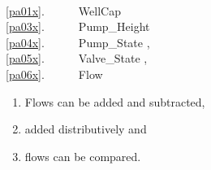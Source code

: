 \bp
\>\ \\
\ref{pa01x}.\ \ \ \ \ \ WellCap \\
\ref{pa03x}.\ \ \ \ \ \ Pump\_Height \\
\ref{pa04x}.\ \ \ \ \ \ Pump\_State {\EQ}{\EQ} {\LBRACE}{\BAR}, \\
\ref{pa05x}.\ \ \ \ \ \ Valve\_State {\EQ}{\EQ} {\LBRACE}{\BAR}, \\
\ref{pa06x}.\ \ \ \ \ \ Flow 
\ep
\begin{enumerate}\setei
\item \label{pa05y1} Flows can be added and subtracted,
\item \label{pa05y2} added distributively  and
\item \label{pa05z} flows can be compared.
\savei\end{enumerate}

